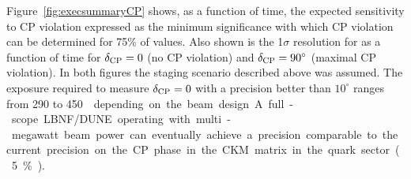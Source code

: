 %
Figure~\ref{fig:execsummaryCP} shows, as a function of time, the
expected sensitivity to CP violation expressed as the minimum significance
with which CP violation can be determined for 75\% of
\deltacp values.
Also shown is the 1$\sigma$ resolution for \deltacp as a
function of time for $\delta_{\rm CP}=0$ (no CP violation) and
$\delta_{\rm CP}=90^\circ$ (maximal CP violation). In both figures the staging scenario
described above was assumed.  The exposure required to measure
$\delta_{\rm CP} = 0 $ with a precision better than $10^\circ$ ranges
from 290 to \SI{450}\ktMWyr{} depending on the beam design.

A full-scope LBNF/DUNE operating with multi-megawatt 
beam power can eventually achieve a precision 
comparable to the current precision on the CP phase in the
CKM matrix in the quark sector (5\%).

